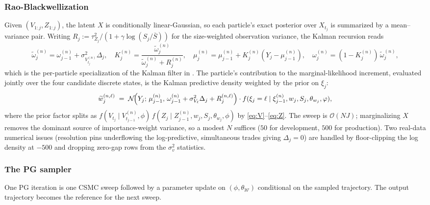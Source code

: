 \subsubsection{Rao-Blackwellization}

Given $(V_{1:j}, Z_{1:j})$, the latent $X$ is conditionally linear-Gaussian, so each particle's exact posterior over $X_{t_j}$ is summarized by a mean--variance pair. Writing $R_j := \tau^2_{Z_j} / (1 + \gamma \log(S_j/\bar S))$ for the size-weighted observation variance, the Kalman recursion reads
\begin{equation}\label{eq:kalman}
\widetilde\omega^{(n)}_j = \omega^{(n)}_{j-1} + \sigma^2_{V^{(n)}_{t_j}}\Delta_j, \quad
K^{(n)}_j = \frac{\widetilde\omega^{(n)}_j}{\widetilde\omega^{(n)}_j + R^{(n)}_j}, \quad
\mu^{(n)}_j = \mu^{(n)}_{j-1} + K^{(n)}_j (Y_j - \mu^{(n)}_{j-1}), \quad
\omega^{(n)}_j = (1 - K^{(n)}_j)\,\widetilde\omega^{(n)}_j,
\end{equation}
which is the per-particle specialization of the Kalman filter in \citep[Ex.~9.2]{sanzalonso2025notes}. The particle's contribution to the marginal-likelihood increment, evaluated jointly over the four candidate discrete states, is the Kalman predictive density weighted by the prior on $\xi_j$:
\begin{equation}\label{eq:rb-weight}
\widetilde w^{(n,\ell)}_j \;=\; \Nc\!\left(Y_j;\, \mu^{(n)}_{j-1},\, \omega^{(n)}_{j-1} + \sigma^2_{V_\ell}\Delta_j + R^{(n,\ell)}_j\right) \cdot f(\xi_j = \ell \mid \xi^{(n)}_{j-1}, w_j, S_j, \theta_{w_j}, \phi),
\end{equation}
where the prior factor splits as $f(V_{t_j} \mid V^{(n)}_{t_{j-1}}, \phi)\,f(Z_j \mid Z^{(n)}_{j-1}, w_j, S_j, \theta_{w_j}, \phi)$ by \eqref{eq:V}--\eqref{eq:Z}. The sweep is $\mathcal{O}(N J)$; marginalizing $X$ removes the dominant source of importance-weight variance, so a modest $N$ suffices ($50$ for development, $500$ for production). Two real-data numerical issues (resolution pins underflowing the log-predictive, simultaneous trades giving $\Delta_j = 0$) are handled by floor-clipping the log density at $-500$ and dropping zero-gap rows from the $\sigma^2_v$ statistics.

\subsubsection{The PG sampler}

One PG iteration is one CSMC sweep followed by a parameter update on $(\phi, \theta_{\mathcal{W}})$ conditional on the sampled trajectory. The output trajectory becomes the reference for the next sweep.

